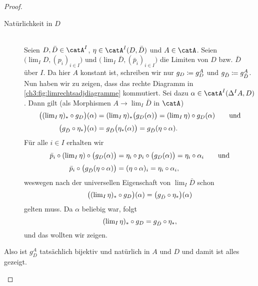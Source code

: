 \begin{proof}
\begin{description}
        \item[Natürlichkeit in \boldmath$D$]\hfill\\
            Seien $D,\bar D\in\catA^I$, $\eta\in\catA^I(D,\bar D)$ und
            $A\in\catA$. Seien $\bigl(\lim_I D,(p_i)_{i\in I}\bigr)$ und 
            $\bigl(\lim_I \bar D,(\bar p_i)_{i\in I}\bigr)$ die Limiten von 
            $D$ bzw. $\bar D$ über $I$. Da hier $A$ konstant ist, schreiben wir
            nur $g_D \coloneqq g_D^A$ und $g_{\bar D} \coloneqq g_{\bar D}^A$.
            Nun haben wir zu zeigen, dass das rechte Diagramm in
            \cref{ch3:fig:limrechtsadjdiagramme} kommutiert.  Sei dazu
            $\alpha\in\catA^I(\Delta^I A, D)$. Dann gilt (als Morphismen
            $A\to\lim_I\bar D$ in $\catA$)
            \begin{align*}
                \bigl((\lim_I\eta)_\ast \after g_D \bigr)(\alpha)
                &= (\lim_I\eta)_\ast \bigl( g_D(\alpha) \bigr)
                 = (\lim_I\eta) \after g_D(\alpha)
                \qquad\text{und}\\[0.5ex]
                \bigl(g_{\bar D}\after\eta_\ast\bigr)(\alpha)
                &= g_{\bar D}\bigl( \eta_\ast(\alpha) \bigr)
                 = g_{\bar D}(\eta\after\alpha)
            . \end{align*}
            Für alle $i\in I$ erhalten wir
            \begin{align*}
                \bar p_i \after (\lim_I\eta) \after \bigl(g_D(\alpha)\bigr)
                &= \eta_i \after p_i \after \bigl(g_D(\alpha)\bigr)
                 = \eta_i \after \alpha_i
                \qquad\text{und}\\[0.5ex]
                \bar p_i \after \bigl(g_{\bar D}(\eta\after\alpha)\bigr)
                &= (\eta\after\alpha)_i = \eta_i\after\alpha_i
            , \end{align*}
            weswegen nach der universellen Eigenschaft von $\lim_I\bar D$
            schon
            \[ \bigl((\lim_I\eta)_\ast \after g_D \bigr)(\alpha)
                = \bigl(g_{\bar D}\after\eta_\ast\bigr)(\alpha)
            \]
            gelten muss. Da $\alpha$ beliebig war, folgt
            \[ (\lim_I\eta)_\ast \after g_D = g_{\bar D}\after\eta_\ast , \]
            und das wollten wir zeigen.
    \end{description}
    Also ist $g_D^A$ tatsächlich bijektiv und natürlich in $A$ und $D$ und damit
    ist alles gezeigt.
    \\
    \begin{figure}
        \centering

\end{figure}
\end{proof}
